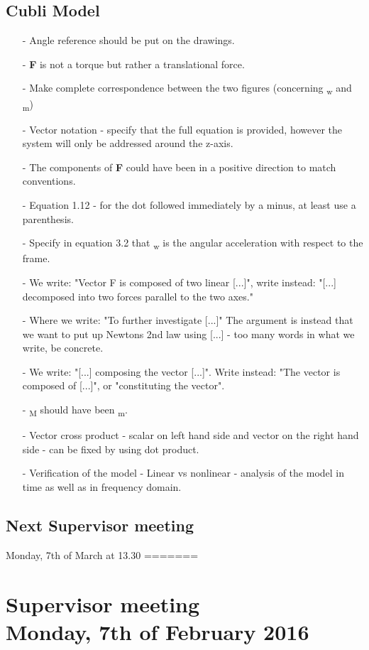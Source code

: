 \subsection{Cubli Model}
\begin{itemize}
\item[-] Angle reference should be put on the drawings.
\item[-] \textbf{F} is not a torque but rather a translational force.
\item[-] Make complete correspondence between the two figures (concerning \si{\tau_w} and \nolinebreak\si{\tau_m})
\item[-] Vector notation - specify that the full equation is provided, however the system will only be addressed around the z-axis.
\item[-] The components of \textbf{F} could have been in a positive direction to match conventions.
\item[-] Equation 1.12 - for the dot followed immediately by a minus, at least use a parenthesis.
\item[-] Specify in equation 3.2 that \si{\ddot{\theta}_w} is the angular acceleration with respect to the frame.
\item[-] We write: "Vector F is composed of two linear [...]", write instead: "[...] decomposed into two forces parallel to the two axes."
\item[-] Where we write: "To further investigate [...]" \si{\rightarrow} The argument is instead that we want to put up Newtons 2nd law using [...] - too many words in what we write, be concrete.
\item[-] We write: "[...] composing the vector [...]". Write instead: "The vector is composed of [...]", or "constituting the vector".
\item[-] \si{\tau_M} should have been \si{\tau_m}.
\item[-] Vector cross product - scalar on left hand side and vector on the right hand side - can be fixed by using dot product.
\item[-] Verification of the model - Linear vs nonlinear - analysis of the model in time as well as in frequency domain.
\end{itemize}

\subsection{Next Supervisor meeting}
Monday, 7th of March at 13.30
=======
\section*{Supervisor meeting\\ \small Monday, 7th of February 2016}

